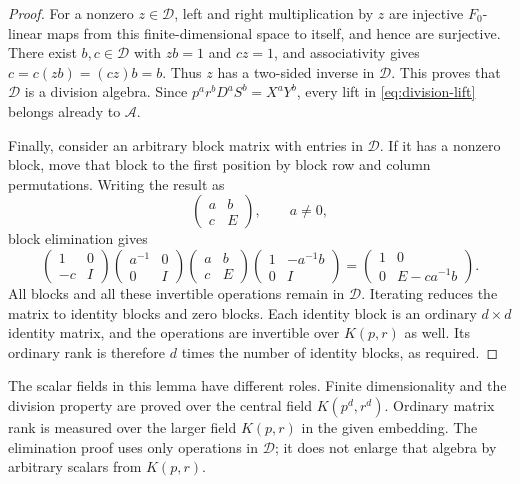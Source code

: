 \begin{proof}
For a nonzero $z\in\mathcal D$, left and right multiplication by $z$
are injective $F_0$-linear maps from this finite-dimensional space to
itself, and hence are surjective.  There exist $b,c\in\mathcal D$
with $zb=1$ and $cz=1$, and associativity gives
$c=c(zb)=(cz)b=b$.  Thus $z$ has a two-sided inverse in
$\mathcal D$.  This proves that $\mathcal D$ is a division algebra.
Since $p^ar^bD^aS^b=X^aY^b$, every lift in
\eqref{eq:division-lift} belongs already to $\mathcal A$.

Finally, consider an arbitrary block matrix with entries in
$\mathcal D$.  If it has a nonzero block, move that block to the
first position by block row and column permutations.  Writing the
result as
\[
  \begin{pmatrix}a&b\\c&E\end{pmatrix},\qquad a\ne0,
\]
block elimination gives
\[
  \begin{pmatrix}1&0\\-c&I\end{pmatrix}
  \begin{pmatrix}a^{-1}&0\\0&I\end{pmatrix}
  \begin{pmatrix}a&b\\c&E\end{pmatrix}
  \begin{pmatrix}1&-a^{-1}b\\0&I\end{pmatrix}
  =
  \begin{pmatrix}1&0\\0&E-ca^{-1}b\end{pmatrix}.
\]
All blocks and all these invertible operations remain in
$\mathcal D$.  Iterating reduces the matrix to identity blocks and
zero blocks.  Each identity block is an ordinary $d\times d$
identity matrix, and the operations are invertible over $K(p,r)$
as well.  Its ordinary rank is therefore $d$ times the number of
identity blocks, as required.
\end{proof}

The scalar fields in this lemma have different roles.  Finite
dimensionality and the division property are proved over the central
field $K(p^d,r^d)$.  Ordinary matrix rank is measured over the larger
field $K(p,r)$ in the given embedding.  The elimination proof uses
only operations in $\mathcal D$; it does not enlarge that algebra by
arbitrary scalars from $K(p,r)$.

